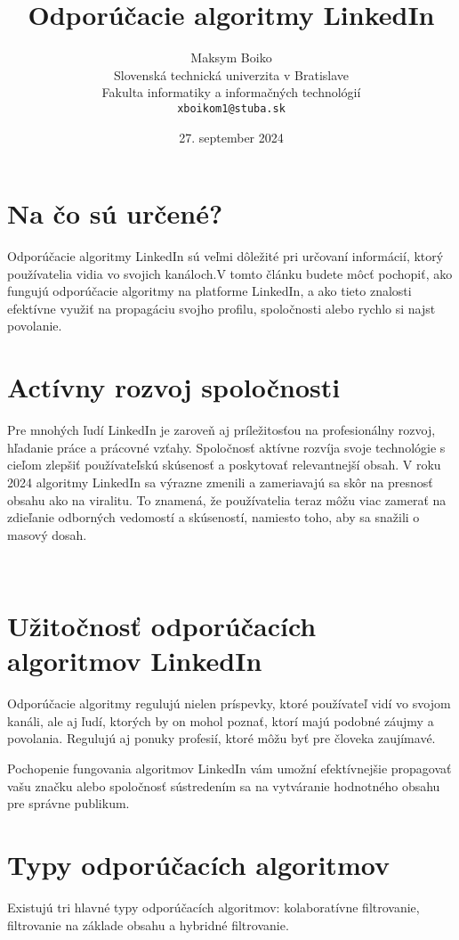 \documentclass[twoside,slovak,a4paper]{coursepaper}
\title{Odporúčacie algoritmy LinkedIn\centering}
\author{Maksym Boiko\\[2pt]
{ Slovenská technická univerzita v Bratislave}\\
{ Fakulta informatiky a informačných technológií}\\
{ \texttt{xboikom1@stuba.sk}}
}
\date{\small 27. september 2024}
\begin{document}
\maketitle

\section{Na čo sú určené?}
Odporúčacie algoritmy LinkedIn sú veľmi dôležité pri určovaní informácií, ktorý používatelia vidia vo svojich kanáloch.V tomto článku budete môcť pochopiť, ako fungujú odporúčacie algoritmy na platforme LinkedIn, a ako tieto znalosti efektívne využiť na propagáciu svojho profilu, spoločnosti alebo rychlo si najst povolanie.

\section{Actívny rozvoj spoločnosti} \label{rozvoj spoločnosti}

Pre mnohých ľudí LinkedIn je zaroveň aj príležitosťou na profesionálny rozvoj, hľadanie práce a prácovné vzťahy.
Spoločnosť aktívne rozvíja svoje technológie s cieľom zlepšiť používateľskú skúsenosť a poskytovať relevantnejší obsah. V roku 2024 algoritmy LinkedIn sa výrazne zmenili a zameriavajú sa skôr na presnosť obsahu ako na viralitu. To znamená, že používatelia teraz môžu viac zamerať na zdieľanie odborných vedomostí a skúseností, namiesto toho, aby sa snažili o masový dosah.

~\cite{Oladipo:article}

\section{Užitočnosť odporúčacích algoritmov LinkedIn} \label{Užitočnosť}
Odporúčacie algoritmy regulujú nielen príspevky, ktoré používateľ vidí vo svojom kanáli, ale aj ľudí, ktorých by on mohol poznať, ktorí majú podobné záujmy a povolania. Regulujú aj ponuky profesií, ktoré môžu byť pre človeka zaujímavé.

Pochopenie fungovania algoritmov LinkedIn vám umožní efektívnejšie propagovať vašu značku alebo spoločnosť sústredením sa na vytváranie hodnotného obsahu pre správne publikum.


\section{Typy odporúčacích algoritmov} \label{Typy}
Existujú tri hlavné typy odporúčacích algoritmov: kolaboratívne filtrovanie, filtrovanie na základe obsahu a hybridné filtrovanie. 
\end{document}
